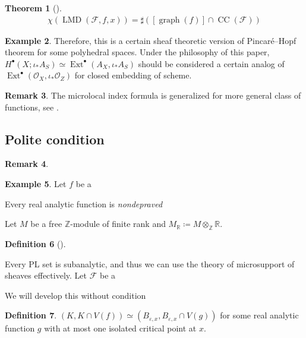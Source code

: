 \documentclass[a4paper,dvipdfmx,reqno,12pt]{amsart}
\theoremstyle{definition}
\newtheorem{Thm}{Theorem}[section]
\newtheorem{Def}[Thm]{Definition}
\newtheorem{Eg}[Thm]{Example}
\newtheorem{Rmk}[Thm]{Remark}
\newcommand{\deq}{\coloneqq}
\newcommand{\R}{\mathbb{R}}%
\newcommand{\Z}{\mathbb{Z}}%
\newcommand{\vep}{\varepsilon}%
\newcommand{\mcal}[1]{\mathcal{#1}}%
\newcommand{\opn}[1]{\operatorname{#1}}
\numberwithin{equation}{section}
\begin{document}
\begin{Thm}[{\cite[Theorem 9.5.6]{}}]

\begin{align}
\chi(\opn{LMD}(\mcal{F},f,x))=\sharp ([\opn{graph}(f)]\cap \opn{CC}(\mcal{F}))
\end{align}
\end{Thm}

\begin{Eg}

Therefore, this is a certain sheaf theoretic version of 
Pincar\'e--Hopf theorem for some polyhedral spaces. Under
the philosophy of this paper, $H^{\bullet}(X;\iota_*A_S)\simeq 
\opn{Ext}^{\bullet}(A_X,\iota_*A_S)$
 should be considered a
certain analog of 
$\opn{Ext}^{\bullet}(\mcal{O}_X,\iota_*\mcal{O}_Z)$ for closed embedding of 
scheme.
\end{Eg}

\begin{Rmk}
The microlocal index formula is generalized for more general 
class of functions, see \cite{}.
\end{Rmk}

\subsection{Polite condition}

\begin{Rmk}

\end{Rmk}

\begin{Eg}
Let $f$ be a 

Every real analytic function is \emph{nondepraved} 
\cite[Part I, Definition. 2.3,]{MR932724}
\end{Eg}

Let $M$ be a free $\Z$-module of finite rank and 
$M_{\R}\deq M\otimes_{\Z}\R$.

\begin{Def}[{\cite{MR4294126}}]

\end{Def}

Every PL set is subanalytic, and thus 
we can use the theory of microsupport of sheaves
effectively.
Let $\mcal{F}$ be a 

We will develop this without condition 

\begin{Def}
$(K, K\cap V(f))\simeq (B_{\vep,x}, B_{\vep,x}\cap V(g))$ 
for some real analytic function $g$ with at most one 
isolated critical point at $x$.
\end{Def}
\end{document}
